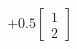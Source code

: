 \documentclass[preview]{standalone}
\begin{document}
\begin{align*}
+  0.5 \begin{bmatrix} 1 \\ 2 \end{bmatrix}
\end{align*}
\end{document}
